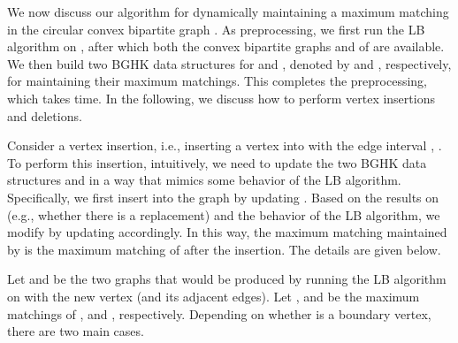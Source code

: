\documentclass[11pt]{article}
\begin{document}
We now discuss our algorithm for dynamically maintaining a
maximum matching in the circular convex bipartite graph . As
preprocessing, we first run the LB algorithm on , after which
both the convex bipartite graphs  and  of  are
available. We then build two BGHK data structures for  and
, denoted by  and , respectively, for
maintaining their maximum matchings. This completes the preprocessing,
which takes  time. In the following, we discuss how to perform
vertex insertions and deletions.

Consider a vertex insertion, i.e., inserting a vertex  into  with the edge
interval , . To perform this insertion, intuitively, we need to
update the two BGHK data structures  and  in a way that mimics some
behavior of the LB algorithm. Specifically, we first insert  into the graph
 by updating . Based on the results on 
(e.g., whether there is a replacement) and the behavior of the LB algorithm,
we modify  by updating  accordingly.
In this way, the maximum matching maintained by
 is the maximum matching of  after the insertion.
The details are given below.

Let  and  be the two graphs
that would be produced by running the LB algorithm on  with the new vertex 
(and its adjacent edges). Let , and  be the maximum
matchings of , and , respectively.
Depending on whether  is a boundary
vertex, there are two main cases.
\end{document}
